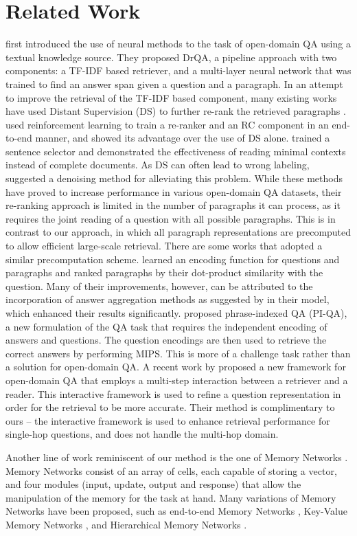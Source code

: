 \documentclass[11pt,a4paper,dvipsnames]{article}
\begin{document}
\section{Related Work}
\citet{ChenFWB17drqa} first introduced the use of neural methods to the task of open-domain QA using a textual knowledge source. They proposed DrQA, a pipeline approach with two components: a TF-IDF based retriever, and a multi-layer neural network that was trained to find an answer span given a question and a paragraph.
In an attempt to improve the retrieval of the TF-IDF based component, many existing works have used Distant Supervision (DS) to further re-rank the retrieved paragraphs \citep{HtutBC18ranking, Yan2018deepCascade}.
\citet{WangYGWKZCTZJ18r3} used reinforcement learning to train a re-ranker and an RC component in an end-to-end manner, and showed its advantage over the use of DS alone. 
\citet{SocherZXM18minimal} trained a sentence selector and demonstrated the effectiveness of reading minimal contexts instead of complete documents. As DS can often lead to wrong labeling, \citet{SunLLJ18denoise} suggested a denoising method for alleviating this problem. While these methods have proved to increase performance in various open-domain QA datasets, their re-ranking approach is limited in the number of paragraphs it can process, as it requires the joint reading of a question with all possible paragraphs. This is in contrast to our approach, in which all paragraph representations are precomputed to allow efficient large-scale retrieval. There are some works that adopted a similar precomputation scheme.
\citet{LeeYKKK18answerrecall} learned an encoding function for questions and paragraphs and ranked paragraphs by their dot-product similarity with the question. Many of their improvements, however, can be attributed to the incorporation of answer aggregation methods as suggested by \citet{wang2018evidence} in their model, which enhanced their results significantly.
\citet{SeoKPFH18piqa} proposed phrase-indexed QA (PI-QA), a new formulation of the QA task that requires the independent encoding of answers and questions. The question encodings are then used to retrieve the correct answers by performing MIPS. This is more of a challenge task rather than a solution for open-domain QA.
A recent work by \citet{das2018multistep} proposed a new framework for open-domain QA that employs a multi-step interaction between a retriever and a reader. This interactive framework is used to refine a question representation in order for the retrieval to be more accurate. Their method is complimentary to ours -- the interactive framework is used to enhance retrieval performance for single-hop questions, and does not handle the multi-hop domain. \par
Another line of work reminiscent of our method is the one of Memory Networks \citep{memory_networks}. Memory Networks consist of an array of cells, each capable of storing a vector, and four modules (input, update, output and response) that allow the manipulation of the memory for the task at hand. Many variations of Memory Networks have been proposed, such as end-to-end Memory Networks \citep{end-to-end-memory-networks}, Key-Value Memory Networks \citep{miller-etal-2016-key-value}, and Hierarchical Memory Networks \citep{chandar2016hierarchical}.
\end{document}
